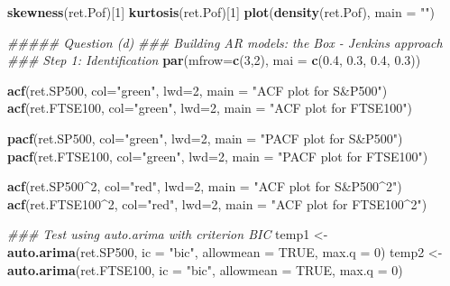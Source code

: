 \documentclass[]{article}
\newenvironment{Shaded}{\begin{snugshade}}{\end{snugshade}}
\newcommand{\CommentTok}[1]{\textcolor[rgb]{0.56,0.35,0.01}{\textit{#1}}}
\newcommand{\DataTypeTok}[1]{\textcolor[rgb]{0.13,0.29,0.53}{#1}}
\newcommand{\DecValTok}[1]{\textcolor[rgb]{0.00,0.00,0.81}{#1}}
\newcommand{\FloatTok}[1]{\textcolor[rgb]{0.00,0.00,0.81}{#1}}
\newcommand{\KeywordTok}[1]{\textcolor[rgb]{0.13,0.29,0.53}{\textbf{#1}}}
\newcommand{\NormalTok}[1]{#1}
\newcommand{\OperatorTok}[1]{\textcolor[rgb]{0.81,0.36,0.00}{\textbf{#1}}}
\newcommand{\OtherTok}[1]{\textcolor[rgb]{0.56,0.35,0.01}{#1}}
\newcommand{\StringTok}[1]{\textcolor[rgb]{0.31,0.60,0.02}{#1}}
\begin{document}
\begin{Shaded}
\begin{Highlighting}[]
{{{{{{{{{{{\KeywordTok{skewness}\NormalTok{(ret.Pof)[}\DecValTok{1}\NormalTok{]}
\KeywordTok{kurtosis}\NormalTok{(ret.Pof)[}\DecValTok{1}\NormalTok{]}
\KeywordTok{plot}\NormalTok{(}\KeywordTok{density}\NormalTok{(ret.Pof), }\DataTypeTok{main =} \StringTok{""}\NormalTok{)}

\CommentTok{##### Question (d)}
\CommentTok{### Building AR models: the Box - Jenkins approach}
\CommentTok{### Step 1: Identification}
\KeywordTok{par}\NormalTok{(}\DataTypeTok{mfrow=}\KeywordTok{c}\NormalTok{(}\DecValTok{3}\NormalTok{,}\DecValTok{2}\NormalTok{), }\DataTypeTok{mai =} \KeywordTok{c}\NormalTok{(}\FloatTok{0.4}\NormalTok{, }\FloatTok{0.3}\NormalTok{, }\FloatTok{0.4}\NormalTok{, }\FloatTok{0.3}\NormalTok{))}

\KeywordTok{acf}\NormalTok{(ret.SP500, }\DataTypeTok{col=}\StringTok{"green"}\NormalTok{, }\DataTypeTok{lwd=}\DecValTok{2}\NormalTok{, }\DataTypeTok{main =} \StringTok{"ACF plot for S&P500"}\NormalTok{)}
\KeywordTok{acf}\NormalTok{(ret.FTSE100, }\DataTypeTok{col=}\StringTok{"green"}\NormalTok{, }\DataTypeTok{lwd=}\DecValTok{2}\NormalTok{, }\DataTypeTok{main =} \StringTok{"ACF plot for FTSE100"}\NormalTok{)}

\KeywordTok{pacf}\NormalTok{(ret.SP500, }\DataTypeTok{col=}\StringTok{"green"}\NormalTok{, }\DataTypeTok{lwd=}\DecValTok{2}\NormalTok{, }\DataTypeTok{main =} \StringTok{"PACF plot for S&P500"}\NormalTok{)}
\KeywordTok{pacf}\NormalTok{(ret.FTSE100, }\DataTypeTok{col=}\StringTok{"green"}\NormalTok{, }\DataTypeTok{lwd=}\DecValTok{2}\NormalTok{, }\DataTypeTok{main =} \StringTok{"PACF plot for FTSE100"}\NormalTok{)}

\KeywordTok{acf}\NormalTok{(ret.SP500}\OperatorTok{^}\DecValTok{2}\NormalTok{, }\DataTypeTok{col=}\StringTok{"red"}\NormalTok{, }\DataTypeTok{lwd=}\DecValTok{2}\NormalTok{, }\DataTypeTok{main =} \StringTok{"ACF plot for S&P500^2"}\NormalTok{)}
\KeywordTok{acf}\NormalTok{(ret.FTSE100}\OperatorTok{^}\DecValTok{2}\NormalTok{, }\DataTypeTok{col=}\StringTok{"red"}\NormalTok{, }\DataTypeTok{lwd=}\DecValTok{2}\NormalTok{, }\DataTypeTok{main =} \StringTok{"ACF plot for FTSE100^2"}\NormalTok{)}

\CommentTok{### Test using auto.arima with criterion BIC }
\NormalTok{temp1 <-}\StringTok{ }\KeywordTok{auto.arima}\NormalTok{(ret.SP500, }\DataTypeTok{ic =} \StringTok{"bic"}\NormalTok{, }\DataTypeTok{allowmean =} \OtherTok{TRUE}\NormalTok{, }\DataTypeTok{max.q =} \DecValTok{0}\NormalTok{)}
\NormalTok{temp2 <-}\StringTok{ }\KeywordTok{auto.arima}\NormalTok{(ret.FTSE100, }\DataTypeTok{ic =} \StringTok{"bic"}\NormalTok{, }\DataTypeTok{allowmean =} \OtherTok{TRUE}\NormalTok{, }\DataTypeTok{max.q =} \DecValTok{0}\NormalTok{)}

}}}}}}}}}}}
\end{Highlighting}
\end{Shaded}
\end{document}
